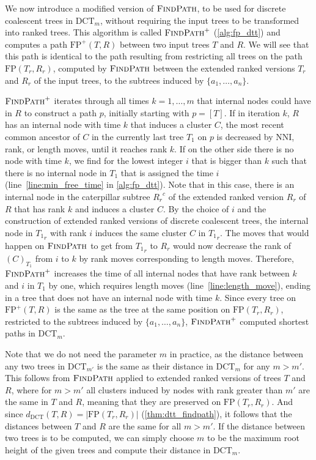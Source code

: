 \documentclass[11pt]{amsart}
\newcommand{\findpath}{\textsc{FindPath}}
\newcommand{\nni}{\mathrm{NNI}}
\newcommand{\fp}{\mathrm{FP}}
\newcommand{\dct}{\mathrm{DCT}}
\begin{document}
We now introduce a modified version of $\findpath$, to be used for discrete coalescent trees in $\dct_m$, without requiring the input trees to be transformed into ranked trees.
This algorithm is called $\findpath^+$ (\autoref{alg:fp_dtt}) and computes a path $\fp^+(T,R)$ between two input trees $T$ and $R$.
We will see that this path is identical to the path resulting from restricting all trees on the path $\fp(T_r,R_r)$, computed by $\findpath$ between the extended ranked versions $T_r$ and $R_r$ of the input trees, to the subtrees induced by $\{a_1, \ldots, a_n\}$.

$\findpath^+$ iterates through all times $k = 1, \ldots, m$ that internal nodes could have in $R$ to construct a path $p$, initially starting with $p = [T]$.
If in iteration $k$, $R$ has an internal node with time $k$ that induces a cluster $C$, the most recent common ancestor of $C$ in the currently last tree $T_1$ on $p$ is decreased by $\nni$, rank, or length moves, until it reaches rank $k$.
If on the other side there is no node with time $k$, we find for the lowest integer $i$ that is bigger than $k$ such that there is no internal node in $T_1$ that is assigned the time $i$ (line~\ref{line:min_free_time} in \autoref{alg:fp_dtt}).
Note that in this case, there is an internal node in the caterpillar subtree ${R_r}^c$ of the extended ranked version $R_r$ of $R$ that has rank $k$ and induces a cluster $C$.
By the choice of $i$ and the construction of extended ranked versions of discrete coalescent trees, the internal node in ${T_1}_r$ with rank $i$ induces the same cluster $C$ in ${T_1}_r$.
The moves that would happen on $\findpath$ to get from ${T_1}_r$ to $R_r$ would now decrease the rank of $(C)_{T_1}$ from $i$ to $k$ by rank moves corresponding to length moves.
Therefore, $\findpath^+$ increases the time of all internal nodes that have rank between $k$ and $i$ in $T_1$ by one, which requires length moves (line~\ref{line:length_move}), ending in a tree that does not have an internal node with time $k$.
Since every tree on $\fp^+(T,R)$ is the same as the tree at the same position on $\fp(T_r,R_r)$, restricted to the subtrees induced by $\{a_1, \ldots, a_n\}$, $\findpath^+$ computed shortest paths in $\dct_m$.

Note that we do not need the parameter $m$ in practice, as the distance between any two trees in $\dct_{m'}$ is the same as their distance in $\dct_m$ for any $m > m'$.
This follows from $\findpath$ applied to extended ranked versions of trees $T$ and $R$, where for $m>m'$ all clusters induced by nodes with rank greater than $m'$ are the same in $T$ and $R$, meaning that they are preserved on $\fp(T_r,R_r)$.
And since $d_{\dct}(T,R) = |\fp(T_r,R_r)|$ (\autoref{thm:dtt_findpath}), it follows that the distances between $T$ and $R$ are the same for all $m > m'$.
If the distance between two trees is to be computed, we can simply choose $m$ to be the maximum root height of the given trees and compute their distance in $\dct_m$.
\end{document}

